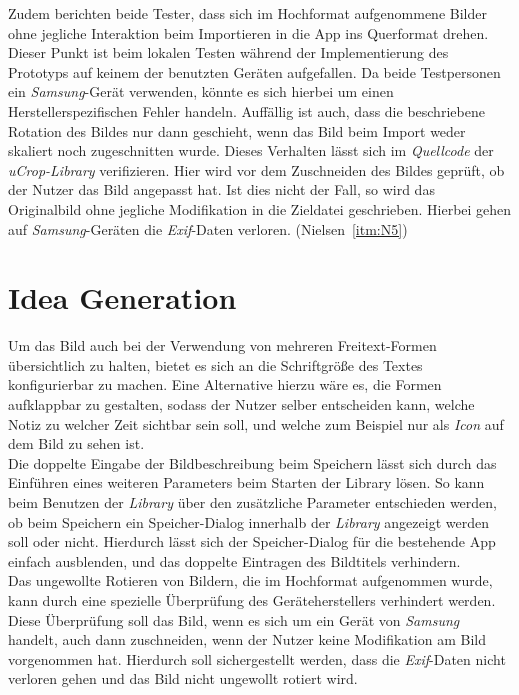 Zudem berichten beide Tester, dass sich im Hochformat aufgenommene Bilder ohne jegliche Interaktion beim Importieren in die App ins Querformat drehen.
Dieser Punkt ist beim lokalen Testen während der Implementierung des Prototyps auf keinem der benutzten Geräten aufgefallen.
Da beide Testpersonen ein \emph{Samsung}-Gerät verwenden, könnte es sich hierbei um einen Herstellerspezifischen Fehler handeln.
Auffällig ist auch, dass die beschriebene Rotation des Bildes nur dann geschieht, wenn das Bild beim Import weder skaliert noch zugeschnitten wurde.
Dieses Verhalten lässt sich im \emph{Quellcode} der \emph{uCrop-Library} verifizieren.
Hier wird vor dem Zuschneiden des Bildes geprüft, ob der Nutzer das Bild angepasst hat.
Ist dies nicht der Fall, so wird das Originalbild ohne jegliche Modifikation in die Zieldatei geschrieben.
Hierbei gehen auf \emph{Samsung}-Geräten die \emph{Exif}-Daten verloren.
(Nielsen~\autoref{itm:N5}) \\ 

\section{Idea Generation}\label{sec:idea4}
Um das Bild auch bei der Verwendung von mehreren Freitext-Formen übersichtlich zu halten, bietet es sich an die Schriftgröße des Textes konfigurierbar zu machen.
Eine Alternative hierzu wäre es, die Formen aufklappbar zu gestalten, sodass der Nutzer selber entscheiden kann, welche Notiz zu welcher Zeit sichtbar sein soll, und welche zum Beispiel nur als \emph{Icon} auf dem Bild zu sehen ist. \\

Die doppelte Eingabe der Bildbeschreibung beim Speichern lässt sich durch das Einführen eines weiteren Parameters beim Starten der Library lösen.
So kann beim Benutzen der \emph{Library} über den zusätzliche Parameter entschieden werden, ob beim Speichern ein Speicher-Dialog innerhalb der \emph{Library} angezeigt werden soll oder nicht.
Hierdurch lässt sich der Speicher-Dialog für die bestehende App einfach ausblenden, und das doppelte Eintragen des Bildtitels verhindern. \\

Das ungewollte Rotieren von Bildern, die im Hochformat aufgenommen wurde, kann durch eine spezielle Überprüfung des Geräteherstellers verhindert werden.
Diese Überprüfung soll das Bild, wenn es sich um ein Gerät von \emph{Samsung} handelt, auch dann zuschneiden, wenn der Nutzer keine Modifikation am Bild vorgenommen hat.
Hierdurch soll sichergestellt werden, dass die \emph{Exif}-Daten nicht verloren gehen und das Bild nicht ungewollt rotiert wird.

